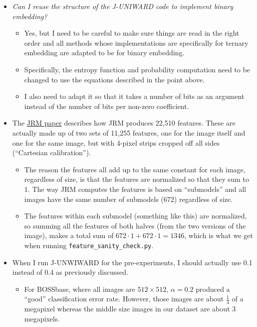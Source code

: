 \documentclass[11pt,a4paper]{report}
\begin{document}
\begin{itemize}
\item \textit{Can I reuse the structure of the J-UNIWARD code to implement binary embedding?}
  \begin{itemize}
  \item Yes, but I need to be careful to make sure things are read in the right order and all methods whose implementations are specifically for ternary embedding are adapted to be for binary embedding.
  \item Specifically, the entropy function and probability computation need to be changed to use the equations described in the point above.
  \item I also need to adapt it so that it takes a number of bits as an argument instead of the number of bits per non-zero coefficient.
  \end{itemize}

\item The \href{http://dde.binghamton.edu/kodovsky/pdf/SPIE2012_Kodovsky_Steganalysis_of_JPEG_Images_Using_Rich_Models_paper.pdf}{JRM paper} describes how JRM produces 22,510 features. These are actually made up of two sets of 11,255 features, one for the image itself and one for the same image, but with 4-pixel strips cropped off all sides (``Cartesian calibration'').
  \begin{itemize}
  \item The reason the features all add up to the same constant for each image, regardless of size, is that the features are normalized so that they sum to 1. The way JRM computes the features is based on ``submodels'' and all images have the same number of submodels (672) regardless of size.
  \item The features within each submodel (something like this) are normalized, so summing all the features of both halves (from the two versions of the image), makes a total sum of $672\cdot1 + 672\cdot1 = 1346$, which is what we get when running \texttt{feature\_sanity\_check.py}.
  \end{itemize}

\item When I run J-UNWIWARD for the pre-experiments, I should actually use 0.1 instead of 0.4 as previously discussed.
  \begin{itemize}
  \item For BOSSbase, where all images are $512 \times 512$, $\alpha = 0.2$ produced a ``good'' classification error rate. However, those images are about $\frac{1}{4}$ of a megapixel whereas the middle size images in our dataset are about $3$ megapixels.
  \end{itemize}


\end{itemize}
\end{document}
